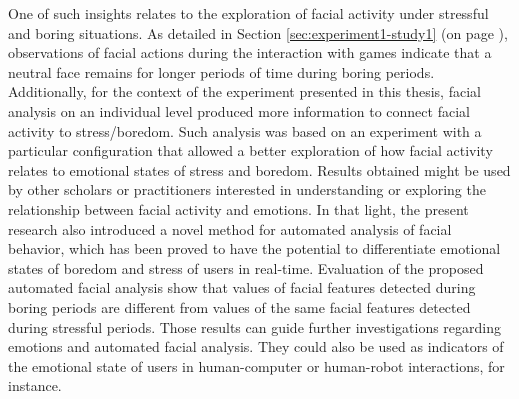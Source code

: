 One of such insights relates to the exploration of facial activity under stressful and boring situations. As detailed in Section \ref{sec:experiment1-study1} (on page \pageref{sec:experiment1-study1}), observations of facial actions during the interaction with games indicate that a neutral face remains for longer periods of time during boring periods. Additionally, for the context of the experiment presented in this thesis, facial analysis on an individual level produced more information to connect facial activity to stress/boredom. Such analysis was based on an experiment with a particular configuration that allowed a better exploration of how facial activity relates to emotional states of stress and boredom. Results obtained might be used by other scholars or practitioners interested in understanding or exploring the relationship between facial activity and emotions. In that light, the present research also introduced a novel method for automated analysis of facial behavior, which has been proved to have the potential to differentiate emotional states of boredom and stress of users in real-time. Evaluation of the proposed automated facial analysis show that values of facial features detected during boring periods are different from values of the same facial features detected during stressful periods. Those results can guide further investigations regarding emotions and automated facial analysis. They could also be used as indicators of the emotional state of users in human-computer or human-robot interactions, for instance.



